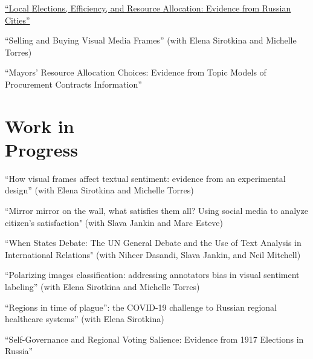 \documentclass[margin,line,10.95pt]{res}
\begin{document}
\begin{resume}
\href{https://olgasparyan.com/documents/jmp_feb.pdf}{``Local Elections, Efficiency, and Resource Allocation: Evidence from Russian Cities''}

\vspace*{-2.5mm}

``Selling and Buying Visual Media Frames'' (with Elena Sirotkina and Michelle Torres)

\vspace*{-2.5mm}

``Mayors’ Resource Allocation Choices: Evidence from Topic Models of Procurement
Contracts Information''


\section{\sc Work in \\ Progress}
``How visual frames affect textual sentiment: evidence from an experimental design'' (with Elena Sirotkina and Michelle Torres)

\vspace*{-3.5mm}
``Mirror mirror on the wall, what satisfies them all? Using social media to analyze citizen’s satisfaction" (with Slava Jankin and Marc Esteve)

\vspace*{-3.5mm}
``When States Debate: The UN General Debate and the Use of Text Analysis in International Relations" (with Niheer Dasandi, Slava Jankin, and Neil Mitchell)

\vspace*{-3.5mm}
``Polarizing images classification: addressing annotators bias in visual sentiment labeling'' (with Elena Sirotkina and Michelle Torres)



\vspace*{-3.5mm}
``Regions in time of plague”: the COVID-19 challenge to Russian regional healthcare systems'' (with Elena Sirotkina) 

\vspace*{-3.5mm}
``Self-Governance and Regional Voting Salience: Evidence from 1917 Elections in Russia''


\end{resume}
\end{document}
